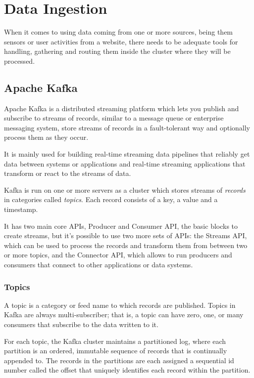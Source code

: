 \chapter{Data Ingestion}

When it comes to using data coming from one or more sources, being them sensors or user activities from a website, there needs to be adequate tools for handling, gathering and routing them inside the cluster where they will be processed.

\section{Apache Kafka}

Apache Kafka is a distributed streaming platform which lets you publish and subscribe to streams of records, similar to a message queue or enterprise messaging system, store streams of records in a fault-tolerant way and optionally process them as they occur. 

It is mainly used for building real-time streaming data pipelines that reliably get data between systems or applications and real-time streaming applications that transform or react to the streams of data.

Kafka is run on one or more servers as a cluster which stores streams of \textit{records} in categories called \textit{topics}. Each record consists of a key, a value and a timestamp.

It has two main core APIs, Producer and Consumer API, the basic blocks to create streams, but it's possible to use two more sets of APIs: the Streams API, which can be used to process the records and transform them from between two or more topics, and the Connector API, which allows to run producers and consumers that connect to other applications or data systems.

\subsection{Topics}

A topic is a category or feed name to which records are published. Topics in Kafka are always multi-subscriber; that is, a topic can have zero, one, or many consumers that subscribe to the data written to it.

For each topic, the Kafka cluster maintains a partitioned log, where each partition is an ordered, immutable sequence of records that is continually appended to. The records in the partitions are each assigned a sequential id number called the offset that uniquely identifies each record within the partition.

